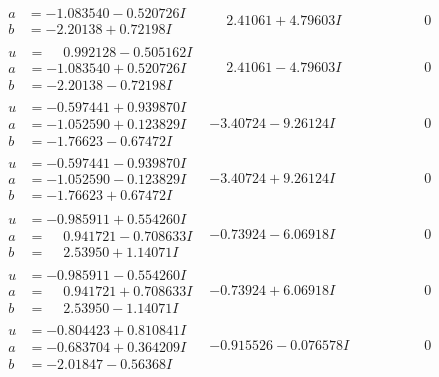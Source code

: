 \documentclass[1p]{elsarticle_modified}
\theoremstyle{definition}
\begin{document}
$$\begin{array}{c|c|c}
\begin{aligned}
a &= -1.083540 - 0.520726 I \\
b &= -2.20138 + 0.72198 I\end{aligned}
 & \phantom{-}2.41061 + 4.79603 I & \phantom{-0.000000 } 0 \\ \hline\begin{aligned}
u &= \phantom{-}0.992128 - 0.505162 I \\
a &= -1.083540 + 0.520726 I \\
b &= -2.20138 - 0.72198 I\end{aligned}
 & \phantom{-}2.41061 - 4.79603 I & \phantom{-0.000000 } 0 \\ \hline\begin{aligned}
u &= -0.597441 + 0.939870 I \\
a &= -1.052590 + 0.123829 I \\
b &= -1.76623 - 0.67472 I\end{aligned}
 & -3.40724 - 9.26124 I & \phantom{-0.000000 } 0 \\ \hline\begin{aligned}
u &= -0.597441 - 0.939870 I \\
a &= -1.052590 - 0.123829 I \\
b &= -1.76623 + 0.67472 I\end{aligned}
 & -3.40724 + 9.26124 I & \phantom{-0.000000 } 0 \\ \hline\begin{aligned}
u &= -0.985911 + 0.554260 I \\
a &= \phantom{-}0.941721 - 0.708633 I \\
b &= \phantom{-}2.53950 + 1.14071 I\end{aligned}
 & -0.73924 - 6.06918 I & \phantom{-0.000000 } 0 \\ \hline\begin{aligned}
u &= -0.985911 - 0.554260 I \\
a &= \phantom{-}0.941721 + 0.708633 I \\
b &= \phantom{-}2.53950 - 1.14071 I\end{aligned}
 & -0.73924 + 6.06918 I & \phantom{-0.000000 } 0 \\ \hline\begin{aligned}
u &= -0.804423 + 0.810841 I \\
a &= -0.683704 + 0.364209 I \\
b &= -2.01847 - 0.56368 I\end{aligned}
 & -0.915526 - 0.076578 I & \phantom{-0.000000 } 0 \\ \hline\begin{aligned}

\end{aligned}
\end{array}$$
\end{document}
